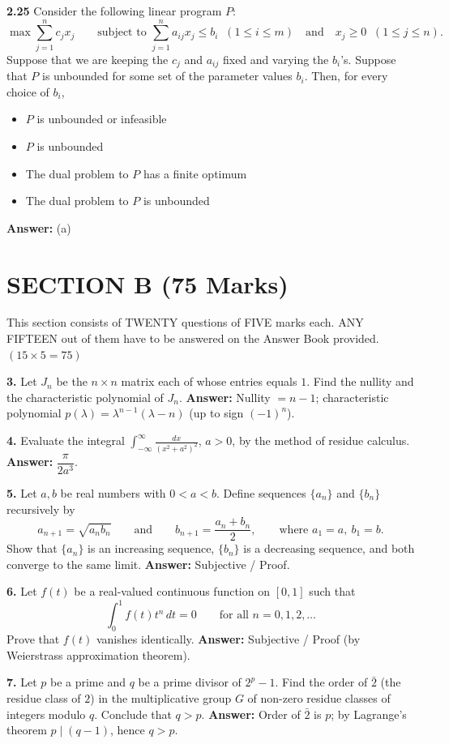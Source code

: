 \documentclass[11pt,a4paper]{article}
\newcommand{\optslist}[4]{%
  \begin{itemize}
    \setlength{\itemsep}{2pt}\setlength{\parskip}{0pt}
    \item[(a)] #1
    \item[(b)] #2
    \item[(c)] #3
    \item[(d)] #4
  \end{itemize}%
}
\newcommand{\ans}[1]{\textbf{Answer:} #1\par\medskip}
\begin{document}
\textbf{2.25} Consider the following linear program $P$:
\[
  \max \sum_{j=1}^{n} c_j x_j \qquad \text{subject to } \sum_{j=1}^{n} a_{ij} x_j \le b_i \;\; (1 \le i \le m) \quad \text{and} \quad x_j \ge 0 \;\; (1 \le j \le n).
\]
Suppose that we are keeping the $c_j$ and $a_{ij}$ fixed and varying the $b_i$'s. Suppose that $P$ is unbounded for some set of the parameter values $b_i$. Then, for every choice of $b_i$,
\optslist{$P$ is unbounded or infeasible}{$P$ is unbounded}{The dual problem to $P$ has a finite optimum}{The dual problem to $P$ is unbounded}
\ans{(a)}

\section*{SECTION B (75 Marks)}

This section consists of TWENTY questions of FIVE marks each. ANY FIFTEEN out of them have to be answered on the Answer Book provided. \hfill $(15 \times 5 = 75)$

\medskip

\textbf{3.} Let $J_n$ be the $n \times n$ matrix each of whose entries equals $1$. Find the nullity and the characteristic polynomial of $J_n$.
\ans{Nullity $= n - 1$; characteristic polynomial $p(\lambda) = \lambda^{n-1}(\lambda - n)$ (up to sign $(-1)^n$).}

\textbf{4.} Evaluate the integral $\displaystyle\int_{-\infty}^{\infty} \frac{dx}{(x^2 + a^2)^2}$, $a > 0$, by the method of residue calculus.
\ans{$\dfrac{\pi}{2a^3}$.}

\textbf{5.} Let $a, b$ be real numbers with $0 < a < b$. Define sequences $\{a_n\}$ and $\{b_n\}$ recursively by
\[
  a_{n+1} = \sqrt{a_n b_n} \qquad \text{and} \qquad b_{n+1} = \frac{a_n + b_n}{2}, \qquad \text{where } a_1 = a,\ b_1 = b.
\]
Show that $\{a_n\}$ is an increasing sequence, $\{b_n\}$ is a decreasing sequence, and both converge to the same limit.
\ans{Subjective / Proof.}

\textbf{6.} Let $f(t)$ be a real-valued continuous function on $[0, 1]$ such that
\[
  \int_0^1 f(t) t^n\,dt = 0 \qquad \text{for all } n = 0, 1, 2, \dots
\]
Prove that $f(t)$ vanishes identically.
\ans{Subjective / Proof (by Weierstrass approximation theorem).}

\textbf{7.} Let $p$ be a prime and $q$ be a prime divisor of $2^p - 1$. Find the order of $\bar{2}$ (the residue class of $2$) in the multiplicative group $G$ of non-zero residue classes of integers modulo $q$. Conclude that $q > p$.
\ans{Order of $\bar{2}$ is $p$; by Lagrange's theorem $p \mid (q - 1)$, hence $q > p$.}
\end{document}
